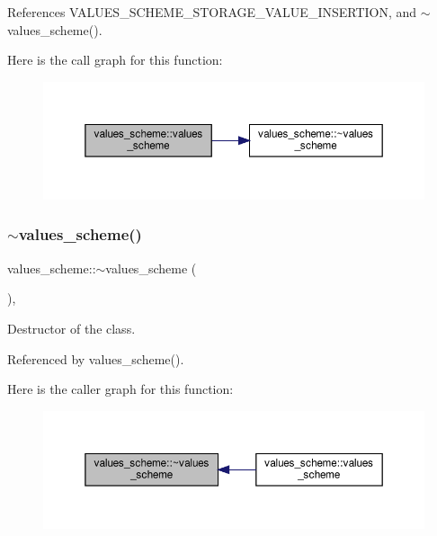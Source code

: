 References V\+A\+L\+U\+E\+S\+\_\+\+S\+C\+H\+E\+M\+E\+\_\+\+S\+T\+O\+R\+A\+G\+E\+\_\+\+V\+A\+L\+U\+E\+\_\+\+I\+N\+S\+E\+R\+T\+I\+ON, and $\sim$values\+\_\+scheme().

Here is the call graph for this function\+:
\nopagebreak
\begin{figure}[H]
\begin{center}
\leavevmode
\includegraphics[width=350pt]{dc/d08/classvalues__scheme_a056d10ea16901129e0a1a722b462b578_cgraph}
\end{center}
\end{figure}
\mbox{\label{classvalues__scheme_a8826089f5df9283b5c9a5c058c1e7893}} 
\subsubsection{\texorpdfstring{$\sim$values\+\_\+scheme()}{~values\_scheme()}}
{\footnotesize\ttfamily values\+\_\+scheme\+::$\sim$values\+\_\+scheme (\begin{DoxyParamCaption}{ }\end{DoxyParamCaption})\hspace{0.3cm}{\ttfamily [override]}, {\ttfamily [default]}}



Destructor of the class. 



Referenced by values\+\_\+scheme().

Here is the caller graph for this function\+:
\nopagebreak
\begin{figure}[H]
\begin{center}
\leavevmode
\includegraphics[width=350pt]{dc/d08/classvalues__scheme_a8826089f5df9283b5c9a5c058c1e7893_icgraph}
\end{center}
\end{figure}


